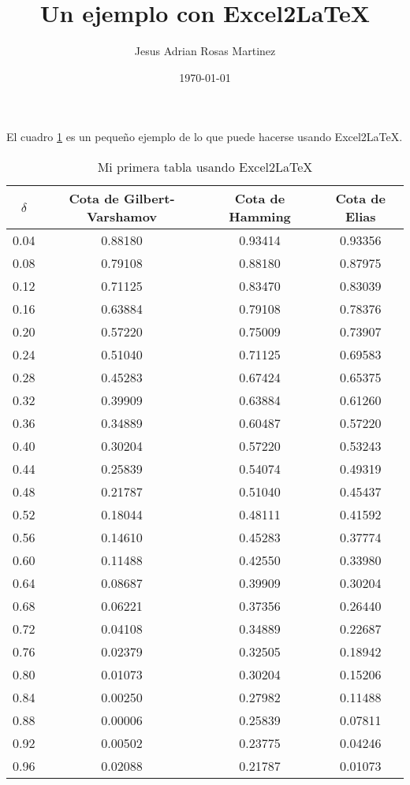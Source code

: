 \documentclass[12pt]{article}
\title{Un ejemplo con Excel2LaTeX}
\author{Jesus Adrian Rosas Martinez}
\date{\small{\today}}
\begin{document}
\maketitle %

El cuadro \ref{tab:cotas} es un pequeño ejemplo de lo que puede hacerse usando Excel2LaTeX.
\begin{table}[htbp]
  \centering
  \caption{Mi primera tabla usando Excel2LaTeX}
    \begin{tabular}{cccc}
    \toprule
    \toprule
    \boldmath{}\textbf{$\delta$}\unboldmath{} & \textbf{Cota de Gilbert-Varshamov} & \textbf{Cota de Hamming} & \textbf{Cota de Elias} \\
    \midrule
    0.04  & 0.88180 & 0.93414 & 0.93356 \\
    0.08  & 0.79108 & 0.88180 & 0.87975 \\
    0.12  & 0.71125 & 0.83470 & 0.83039 \\
    0.16  & 0.63884 & 0.79108 & 0.78376 \\
    0.20  & 0.57220 & 0.75009 & 0.73907 \\
    0.24  & 0.51040 & 0.71125 & 0.69583 \\
    0.28  & 0.45283 & 0.67424 & 0.65375 \\
    0.32  & 0.39909 & 0.63884 & 0.61260 \\
    0.36  & 0.34889 & 0.60487 & 0.57220 \\
    0.40  & 0.30204 & 0.57220 & 0.53243 \\
    0.44  & 0.25839 & 0.54074 & 0.49319 \\
    0.48  & 0.21787 & 0.51040 & 0.45437 \\
    0.52  & 0.18044 & 0.48111 & 0.41592 \\
    0.56  & 0.14610 & 0.45283 & 0.37774 \\
    0.60  & 0.11488 & 0.42550 & 0.33980 \\
    0.64  & 0.08687 & 0.39909 & 0.30204 \\
    0.68  & 0.06221 & 0.37356 & 0.26440 \\
    0.72  & 0.04108 & 0.34889 & 0.22687 \\
    0.76  & 0.02379 & 0.32505 & 0.18942 \\
    0.80  & 0.01073 & 0.30204 & 0.15206 \\
    0.84  & 0.00250 & 0.27982 & 0.11488 \\
    0.88  & 0.00006 & 0.25839 & 0.07811 \\
    0.92  & 0.00502 & 0.23775 & 0.04246 \\
    0.96  & 0.02088 & 0.21787 & 0.01073 \\
    \bottomrule
    \bottomrule
    \end{tabular}%
  \label{tab:cotas}%
\end{table}%
\end{document}
